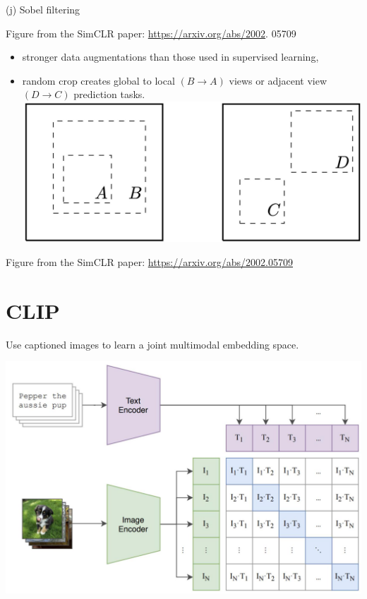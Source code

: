 \documentclass[10pt]{article}
\begin{document}
(j) Sobel filtering

Figure from the SimCLR paper: \href{https://arxiv.org/abs/2002}{https://arxiv.org/abs/2002}. 05709

\begin{itemize}
  \item stronger data augmentations than those used in supervised learning,
  \item random crop creates global to local $(B \rightarrow A)$ views or adjacent view $(D \rightarrow C)$ prediction tasks.
\includegraphics[max width=\textwidth, center]{2024_01_08_7c14f4867d7823fc5a52g-14(10)}
\end{itemize}

Figure from the SimCLR paper: \href{https://arxiv.org/abs/2002.05709}{https://arxiv.org/abs/2002.05709}

\section*{CLIP}
Use captioned images to learn a joint multimodal embedding space.

\begin{center}
\includegraphics[max width=\textwidth]{2024_01_08_7c14f4867d7823fc5a52g-15}
\end{center}
\end{document}
